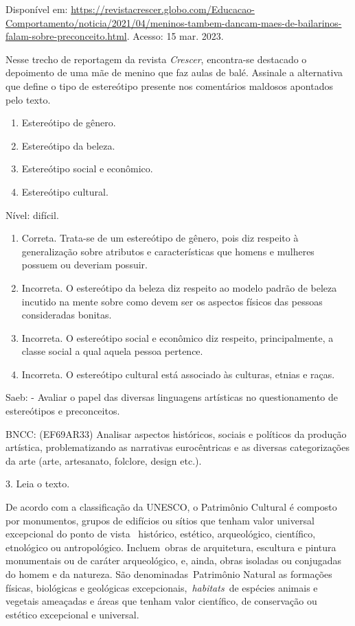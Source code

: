 \begin{escolha}
{{{{{{{{Disponível em:
\url{https://revistacrescer.globo.com/Educacao-Comportamento/noticia/2021/04/meninos-tambem-dancam-maes-de-bailarinos-falam-sobre-preconceito.html}.
Acesso: 15 mar. 2023.

Nesse trecho de reportagem da revista \emph{Crescer}, encontra-se
destacado o depoimento de uma mãe de menino que faz aulas de balé.
Assinale a alternativa que define o tipo de estereótipo presente nos
comentários maldosos apontados pelo texto.

\begin{enumerate}
\def\labelenumi{\alph{enumi})}
\item
  Estereótipo de gênero.
\item
  Estereótipo da beleza.
\item
  Estereótipo social e econômico.
\item
  Estereótipo cultural.
\end{enumerate}

Nível: difícil.

\begin{enumerate}
\def\labelenumi{\alph{enumi}.}
\item
  Correta. Trata-se de um estereótipo de gênero, pois diz respeito à
  generalização sobre atributos e características que homens e mulheres
  possuem ou deveriam possuir.
\item
  Incorreta. O estereótipo da beleza diz respeito ao modelo padrão de
  beleza incutido na mente sobre como devem ser os aspectos físicos das
  pessoas consideradas bonitas.
\item
  Incorreta. O estereótipo social e econômico diz respeito,
  principalmente, a classe social a qual aquela pessoa pertence.
\item
  Incorreta. O estereótipo cultural está associado às culturas, etnias e
  raças.
\end{enumerate}

Saeb: - Avaliar o papel das diversas linguagens artísticas no
questionamento de estereótipos e preconceitos.

BNCC: (EF69AR33) Analisar aspectos históricos, sociais e políticos da
produção artística, problematizando as narrativas eurocêntricas e as
diversas categorizações da arte (arte, artesanato, folclore, design
etc.).

3. Leia o texto.

De acordo com a classificação da UNESCO, o Patrimônio Cultural é
composto por monumentos, grupos de edifícios ou sítios que tenham valor
universal excepcional do ponto de vista ~histórico, estético,
arqueológico, científico, etnológico ou antropológico. Incluem~obras de
arquitetura, escultura e pintura monumentais ou de caráter arqueológico,
e, ainda, obras isoladas ou conjugadas do homem e da natureza. São
denominadas~Patrimônio Natural as formações físicas, biológicas e
geológicas excepcionais,~\emph{habitats}~de espécies animais e vegetais
ameaçadas e áreas que tenham valor científico, de conservação ou
estético excepcional e universal.

}}}}}}}}
\end{escolha}
